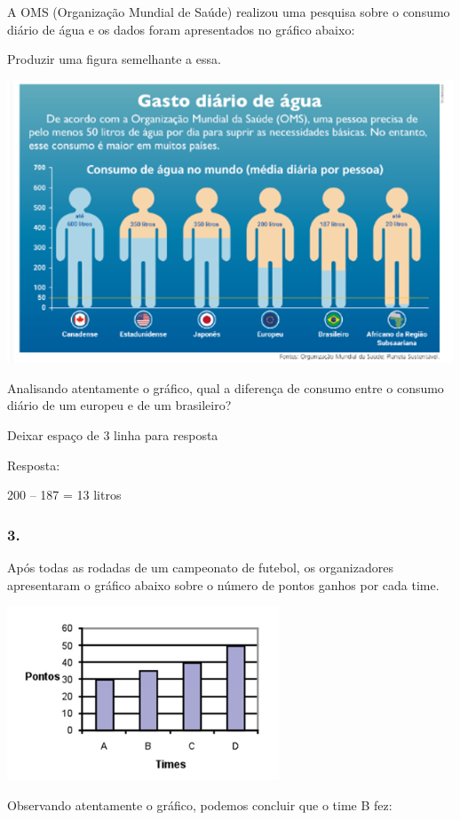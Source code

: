 A OMS (Organização Mundial de Saúde) realizou uma pesquisa sobre o
consumo diário de água e os dados foram apresentados no gráfico abaixo:

Produzir uma figura semelhante a essa.

\includegraphics[width=5.22545in,height=3.31695in]{media/image95.png}

Analisando atentamente o gráfico, qual a diferença de consumo entre o
consumo diário de um europeu e de um brasileiro?

Deixar espaço de 3 linha para resposta

Resposta:

200 -- 187 = 13 litros

\subsubsection{3.}\label{section-93}

Após todas as rodadas de um campeonato de futebol, os organizadores
apresentaram o gráfico abaixo sobre o número de pontos ganhos por cada
time.

\includegraphics[width=3.19194in,height=2.04184in]{media/image96.png}

Observando atentamente o gráfico, podemos concluir que o time B fez:

